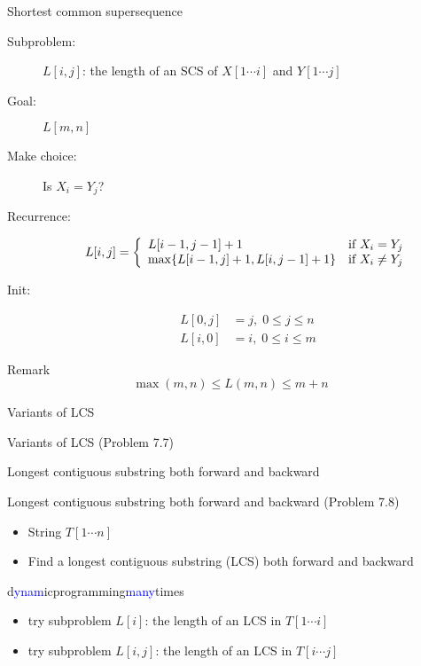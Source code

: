 \begin{frame}{Shortest common supersequence}
  \begin{description}
	\item[Subproblem:] $L[i,j]$: the length of an SCS of $X[1 \cdots i]$ and $Y[1 \cdots j]$
	\item[Goal:] $L[m,n]$
	  \pause
	\item[Make choice:] Is $X_{i} = Y_{j}$?
	\item[Recurrence:] 
	  \begin{displaymath}
		L[i,j] = \left\{ \begin{array}{ll}
		  L[i-1, j-1] + 1 & \textrm{if $X_{i} = Y_{j}$}\\
		  \max \{L[i-1,j] + 1, L[i,j-1] + 1\} & \textrm{if $X_{i} \neq Y_{j}$}
		\end{array} \right.
	  \end{displaymath}
	  \pause
	\item[Init:]
	  \begin{align*}
		L[0,j] &= j, \; 0 \le j \le n \\
		L[i,0] &= i, \; 0 \le i \le m 
	  \end{align*}
  \end{description}

  \pause
  \begin{alertblock}{Remark}
	\[
	  \max(m,n) \le L(m,n) \le m+n
	\]
  \end{alertblock}
\end{frame}
\begin{frame}{Variants of LCS}
  \begin{exampleblock}{Variants of LCS (Problem 7.7)}
  \end{exampleblock}
\end{frame}
\begin{frame}{Longest contiguous substring both forward and backward}
  \begin{exampleblock}{Longest contiguous substring both forward and backward (Problem 7.8)}
    \begin{itemize}
      \item String $T[1 \cdots n]$
      \item Find a longest contiguous substring (LCS) both forward and backward
    \end{itemize}
  \end{exampleblock}

  \begin{center}
	d\textcolor{blue}{ynam}icprogramming\textcolor{blue}{many}times
  \end{center}

  \begin{itemize}
	\item try subproblem $L[i]$: the length of an LCS in $T[1 \cdots i]$
	\item try subproblem $L[i,j]$: the length of an LCS in $T[i \cdots j]$
  \end{itemize}
\end{frame}
